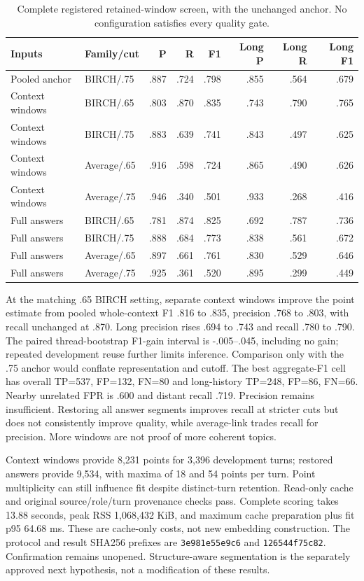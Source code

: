 \documentclass[11pt]{article}
\begin{document}
\begin{table}[ht]
\centering\small
\begin{tabular}{llrrrrrr}
\toprule
Inputs & Family/cut & P & R & F1 & Long P & Long R & Long F1 \\
\midrule
Pooled anchor & BIRCH/.75 & .887 & .724 & .798 & .855 & .564 & .679 \\
Context windows & BIRCH/.65 & .803 & .870 & .835 & .743 & .790 & .765 \\
Context windows & BIRCH/.75 & .883 & .639 & .741 & .843 & .497 & .625 \\
Context windows & Average/.65 & .916 & .598 & .724 & .865 & .490 & .626 \\
Context windows & Average/.75 & .946 & .340 & .501 & .933 & .268 & .416 \\
Full answers & BIRCH/.65 & .781 & .874 & .825 & .692 & .787 & .736 \\
Full answers & BIRCH/.75 & .888 & .684 & .773 & .838 & .561 & .672 \\
Full answers & Average/.65 & .897 & .661 & .761 & .830 & .529 & .646 \\
Full answers & Average/.75 & .925 & .361 & .520 & .895 & .299 & .449 \\
\bottomrule
\end{tabular}
\caption{Complete registered retained-window screen, with the unchanged anchor.
No configuration satisfies every quality gate.}
\end{table}

At the matching .65 BIRCH setting, separate context windows improve the point
estimate from pooled whole-context F1 .816 to .835, precision .768 to .803,
with recall unchanged at .870. Long precision rises .694 to .743 and recall
.780 to .790. The paired thread-bootstrap F1-gain interval is -.005--.045,
including no gain; repeated development reuse further limits inference.
Comparison only with the .75 anchor would conflate representation and cutoff.
The best aggregate-F1 cell has overall TP=537, FP=132, FN=80 and long-history
TP=248, FP=86, FN=66. Nearby unrelated FPR is .600 and distant recall .719.
Precision remains insufficient. Restoring all answer segments improves recall
at stricter cuts but does not consistently improve quality, while average-link
trades recall for precision. More windows are not proof of more coherent topics.

Context windows provide 8,231 points for 3,396 development turns; restored
answers provide 9,534, with maxima of 18 and 54 points per turn. Point
multiplicity can still influence fit despite distinct-turn retention. Read-only
cache and original source/role/turn provenance checks pass. Complete scoring
takes 13.88 seconds, peak RSS 1,068,432 KiB, and maximum cache preparation plus
fit p95 64.68 ms. These are cache-only costs, not new embedding construction.
The protocol and result SHA256 prefixes are \texttt{3e981e55e9c6} and
\texttt{126544f75c82}. Confirmation remains unopened. Structure-aware segmentation
is the separately approved next hypothesis, not a modification of these results.
\end{document}
